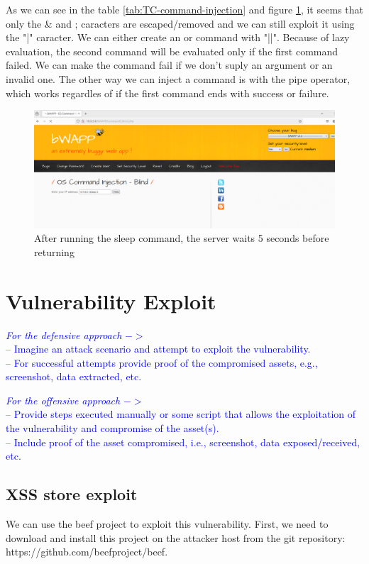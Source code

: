 \documentclass{article}
\begin{document}
As we can see in the table \ref{tab:TC-command-injection} and figure \ref{fig:sleep-command}, it seems that only the \& and ; caracters are escaped/removed and we can still exploit it using the "|" caracter.
We can either create an or command with "||". Because of lazy evaluation, the second command will be evaluated only if the first command failed.
We can make the command fail if we don't suply an argument or an invalid one.
The other way we can inject a command is with the pipe operator, which works regardles of if the first command ends with success or failure.

\begin{figure}
    \centering
    \includegraphics[width=1\linewidth]{Figures/command-injection/sleep-command.png}
    \caption{\label{fig:sleep-command}After running the sleep command, the server waits 5 seconds before returning}
\end{figure}


\section{Vulnerability Exploit}
\label{}

\textcolor{blue}{\textit{For the defensive approach} $->$\\
    -- Imagine an attack scenario and attempt to exploit the vulnerability.\\
    -- For successful attempts provide proof of the compromised assets, e.g., screenshot, data extracted, etc.}

\textcolor{blue}{\textit{For the offensive approach} $->$\\
    -- Provide steps executed manually or some script that allows the exploitation of the vulnerability and compromise of the asset(s).\\
    -- Include proof of the asset compromised, i.e., screenshot, data exposed/received, etc. }


\subsection{XSS store exploit}
\label{section:xss-store-exploit}
We can use the beef project to exploit this vulnerability. First, we need to download and install this project on the attacker host from the git repository: https://github.com/beefproject/beef.
\end{document}
